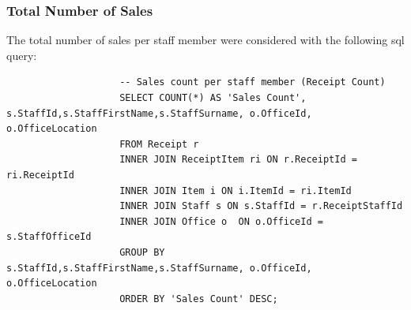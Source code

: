 \documentclass{article}
\begin{document}

            \subsubsection{Total Number of Sales}
                The total number of sales per staff member were considered with the following 
                sql query:
                \begin{lstlisting}
                    -- Sales count per staff member (Receipt Count)
                    SELECT COUNT(*) AS 'Sales Count', s.StaffId,s.StaffFirstName,s.StaffSurname, o.OfficeId, o.OfficeLocation
                    FROM Receipt r
                    INNER JOIN ReceiptItem ri ON r.ReceiptId = ri.ReceiptId
                    INNER JOIN Item i ON i.ItemId = ri.ItemId
                    INNER JOIN Staff s ON s.StaffId = r.ReceiptStaffId
                    INNER JOIN Office o  ON o.OfficeId = s.StaffOfficeId
                    GROUP BY s.StaffId,s.StaffFirstName,s.StaffSurname, o.OfficeId, o.OfficeLocation 
                    ORDER BY 'Sales Count' DESC;
                \end{lstlisting}
\end{document}

